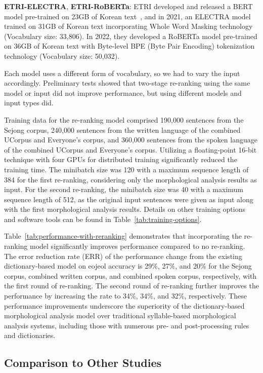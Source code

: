 \documentclass[AMS,STIX2COL]{WileyNJD-v2}
\begin{document}
    \textbf{ETRI-ELECTRA}, \textbf{ETRI-RoBERTa}: ETRI developed and released a BERT model pre-trained on 23GB of Korean text~\cite{KorBERT}, and in 2021, an ELECTRA model trained on 31GB of Korean text incorporating Whole Word Masking technology (Vocabulary size: 33,806).
    In 2022, they developed a RoBERTa model pre-trained on 36GB of Korean text with Byte-level BPE (Byte Pair Encoding) tokenization technology (Vocabulary size: 50,032).

    Each model uses a different form of vocabulary, so we had to vary the input accordingly.
    Preliminary tests showed that two-stage re-ranking using the same model or input did not improve performance, but using different models and input types did.

    Training data for the re-ranking model comprised 190,000 sentences from the Sejong corpus, 240,000 sentences from the written language of the combined UCorpus and Everyone's corpus, and 360,000 sentences from the spoken language of the combined UCorpus and Everyone's corpus.
    Utilizing a floating-point 16-bit technique with four GPUs for distributed training significantly reduced the training time.
    The minibatch size was 120 with a maximum sequence length of 384 for the first re-ranking, considering only the morphological analysis results as input.
    For the second re-ranking, the minibatch size was 40 with a maximum sequence length of 512, as the original input sentences were given as input along with the first morphological analysis results.
    Details on other training options and software tools can be found in Table~\ref{tab:training-options}.

    Table~\ref{tab:performance-with-reranking} demonstrates that incorporating the re-ranking model significantly improves performance compared to no re-ranking.
    The error reduction rate (ERR) of the performance change from the existing dictionary-based model on eojeol accuracy is 29\%, 27\%, and 20\% for the Sejong corpus, combined written corpus, and combined spoken corpus, respectively, with the first round of re-ranking.
    The second round of re-ranking further improves the performance by increasing the rate to 34\%, 34\%, and 32\%, respectively.
    These performance improvements underscore the superiority of the dictionary-based morphological analysis model over traditional syllable-based morphological analysis systems, including those with numerous pre- and post-processing rules and dictionaries.

    \subsection{Comparison to Other Studies}\label{subsec:comparison-to-other-studies}
\end{document}

